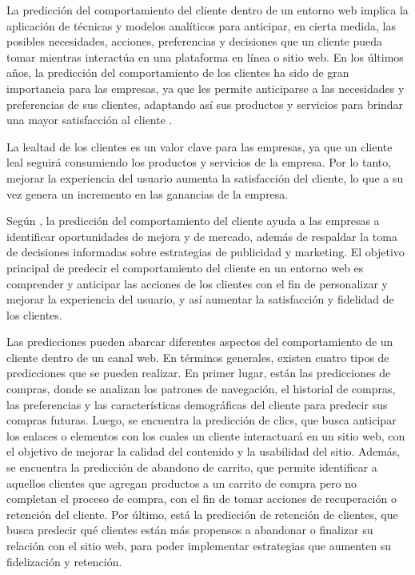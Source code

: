 La predicción del comportamiento del cliente dentro de un entorno web implica la aplicación de técnicas y modelos analíticos para anticipar, en cierta medida, las posibles necesidades, acciones, preferencias y decisiones que un cliente pueda tomar mientras interactúa en una plataforma en línea o sitio web. En los últimos años, la predicción del comportamiento de los clientes ha sido de gran importancia para las empresas, ya que les permite anticiparse a las necesidades y preferencias de sus clientes, adaptando así sus productos y servicios para brindar una mayor satisfacción al cliente \cite{behavior-prediction}.

La lealtad de los clientes es un valor clave para las empresas, ya que un cliente leal seguirá consumiendo los productos y servicios de la empresa. Por lo tanto, mejorar la experiencia del usuario aumenta la satisfacción del cliente, lo que a su vez genera un incremento en las ganancias de la empresa.

Según \cite{behavior-prediction}, la predicción del comportamiento del cliente ayuda a las empresas a identificar oportunidades de mejora y de mercado, además de respaldar la toma de decisiones informadas sobre estrategias de publicidad y marketing. El objetivo principal de predecir el comportamiento del cliente en un entorno web es comprender y anticipar las acciones de los clientes con el fin de personalizar y mejorar la experiencia del usuario, y así aumentar la satisfacción y fidelidad de los clientes.

Las predicciones pueden abarcar diferentes aspectos del comportamiento de un cliente dentro de un canal web. En términos generales, existen cuatro tipos de predicciones que se pueden realizar. En primer lugar, están las predicciones de compras, donde se analizan los patrones de navegación, el historial de compras, las preferencias y las características demográficas del cliente para predecir sus compras futuras. Luego, se encuentra la predicción de clics, que busca anticipar los enlaces o elementos con los cuales un cliente interactuará en un sitio web, con el objetivo de mejorar la calidad del contenido y la usabilidad del sitio. Además, se encuentra la predicción de abandono de carrito, que permite identificar a aquellos clientes que agregan productos a un carrito de compra pero no completan el proceso de compra, con el fin de tomar acciones de recuperación o retención del cliente. Por último, está la predicción de retención de clientes, que busca predecir qué clientes están más propensos a abandonar o finalizar su relación con el sitio web, para poder implementar estrategias que aumenten su fidelización y retención.